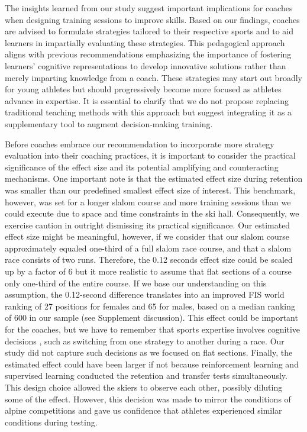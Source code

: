 \documentclass{article}
\begin{document}
The insights learned from our study suggest important implications for coaches when designing training sessions to improve skills. Based on our findings, coaches are advised to formulate strategies tailored to their respective sports and to aid learners in impartially evaluating these strategies. This pedagogical approach aligns with previous recommendations emphasizing the importance of fostering learners' cognitive representations to develop innovative solutions rather than merely imparting knowledge from a coach. These strategies may start out broadly for young athletes but should progressively become more focused as athletes advance in expertise. It is essential to clarify that we do not propose replacing traditional teaching methods with this approach but suggest integrating it as a supplementary tool to augment decision-making training.

Before coaches embrace our recommendation to incorporate more strategy evaluation into their coaching practices, it is important to consider the practical significance of the effect size and its potential amplifying and counteracting mechanisms. One important note is that the estimated effect size during retention was smaller than our predefined smallest effect size of interest. This benchmark, however, was set for a longer slalom course and more training sessions than we could execute due to space and time constraints in the ski hall. Consequently, we exercise caution in outright dismissing its practical significance. Our estimated effect size might be meaningful, however, if we consider that our slalom course approximately equaled one-third of a full slalom race course, and that a slalom race consists of two runs. Therefore, the 0.12 seconds effect size could be scaled up by a factor of 6 but it more realistic to assume that flat sections of a course only one-third of the entire course. If we base our understanding 
on this assumption, the 0.12-second difference translates into an improved FIS world ranking of 27 positions for females and 65 for males, based on a median ranking of 600 in our sample (see Supplement discussion). This effect could be important for the coaches, but we have to remember that sports expertise involves cognitive decisions \cite{mangalam_investigating_2023, krakauer_motor_2019}, such as switching from one strategy to another during a race. Our study did not capture such decisions as we focused on flat sections. Finally, the estimated effect could have been larger if not because reinforcement learning and supervised learning conducted the retention and transfer tests simultaneously. This design choice allowed the skiers to observe each other, possibly diluting some of the effect. However, this decision was made to mirror the conditions of alpine competitions and gave us confidence that athletes experienced similar conditions during testing. 
\end{document}
